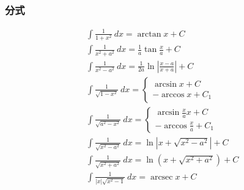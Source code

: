 \subsubsection{分式}
\begin{align}
    &\int \frac{1}{1+x^2}\ dx=\arctan x + C\\
&\int\frac{1}{x^2+a^2} \ dx =\frac{1}{a} \tan \frac{x}{a} + C\\
&\int \frac{1}{x^2-a^2}\ dx=\frac{1}{2a}\ln\left|\frac{x-a}{x+a}\right|+C\\
&\int\frac{1}{\sqrt{1-x^2}}\ dx=\begin{cases}
    \arcsin x + C\\
    -\arccos x +C_1
\end{cases}  \\
&\int\frac{1}{\sqrt{a^2-x^2}}\ dx=\begin{cases}
    \arcsin \frac{x}{a}x + C\\
    -\arccos \frac{x}{a} +C_1
\end{cases}  \\
&\int\frac{1}{\sqrt{x^2-a^2}}\ dx=\ln \left|x+\sqrt{x^2-a^2}\right|+C\\
&\int\frac{1}{\sqrt{x^2+a^2}}\ dx=\ln(x+\sqrt{x^2+a^2})+C\\
&\int\frac{1}{\left|x\right|\sqrt{x^2-1}}\ dx= \operatorname{arcsec} x + C 
\end{align}
